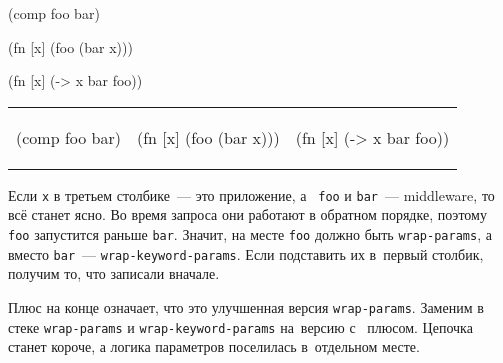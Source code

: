 \ifx\DEVICETYPE\MOBILE

\begin{english}
  \begin{clojure}
(comp foo bar)
  \end{clojure}

\splitter

  \begin{clojure}
(fn [x]
  (foo (bar x)))
  \end{clojure}

\splitter

  \begin{clojure}
(fn [x] (-> x
            bar
            foo))
  \end{clojure}
\end{english}

\else

\begin{english}
\noindent
\begin{tabular}{ @{}p{3.2cm} @{}p{3.5cm} @{}p{3.5cm} }

  \begin{clojure}
(comp foo bar)
  \end{clojure}

&

  \begin{clojure}
(fn [x]
  (foo (bar x)))
  \end{clojure}

&

  \begin{clojure}
(fn [x] (-> x
            bar
            foo))
  \end{clojure}

\end{tabular}

\end{english}

\fi

Если \verb|x| в третьем столбике~--- это приложение, а~ \verb|foo| и
\verb|bar|~--- middleware, то всё станет ясно. Во время запроса они работают в
обратном порядке, поэтому \verb|foo| запустится раньше \verb|bar|. Значит,
на месте \verb|foo| должно быть \verb|wrap-params|, а вместо
\verb|bar|~--- \verb|wrap-keyword-params|. Если подставить их в~первый
столбик, получим то, что записали вначале.

Плюс на конце означает, что это улучшенная версия \verb|wrap-params|. Заменим
в стеке \verb|wrap-params| и \verb|wrap-keyword-params| на~версию с~
плюсом. Цепочка станет короче, а логика параметров поселилась в~отдельном месте.

